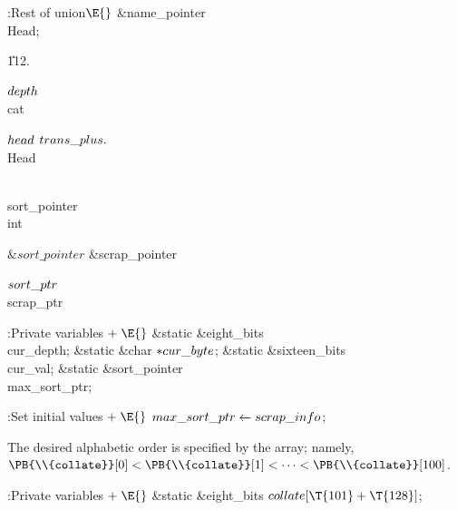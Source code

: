 \Y\B\4:Rest of  union\X${}\E{}$\6
\&{name\_pointer} \\{Head};\par
\U112.\fi

\B\D$\\{depth}$ \5
\\{cat}\par
\B\4\D$\\{head}$ \5
$\\{trans\_plus}.{}$\\{Head}\par
\B\F\\{sort\_pointer}\5
\\{int}\par
\B\4\D$\&{sort\_pointer}$ \5
\&{scrap\_pointer}\par
\B\4\D$\\{sort\_ptr}$ \5
\\{scrap\_ptr}\par
\Y\B\4:Private variables\X${}\mathrel+\E{}$\6
\&{static} \&{eight\_bits} \\{cur\_depth};\6
\&{static} \&{char} ${}{*}\\{cur\_byte}{}$;\6
\&{static} \&{sixteen\_bits} \\{cur\_val};\6
\&{static} \&{sort\_pointer} \\{max\_sort\_ptr};\par
\fi

\B{}:Set initial values\X${}\mathrel+\E{}$\6
$\\{max\_sort\_ptr}\leftarrow\\{scrap\_info}{}$;\par
\fi

The desired alphabetic order is specified by the  array;
namely,
$\PB{\\{collate}}[0]<\PB{\\{collate}}[1]<\cdots<\PB{\\{collate}}[100]$.

\Y\B\4:Private variables\X${}\mathrel+\E{}$\6
\&{static} \&{eight\_bits} ${}\\{collate}[\T{101}+\T{128}]{}$;\par
\fi

